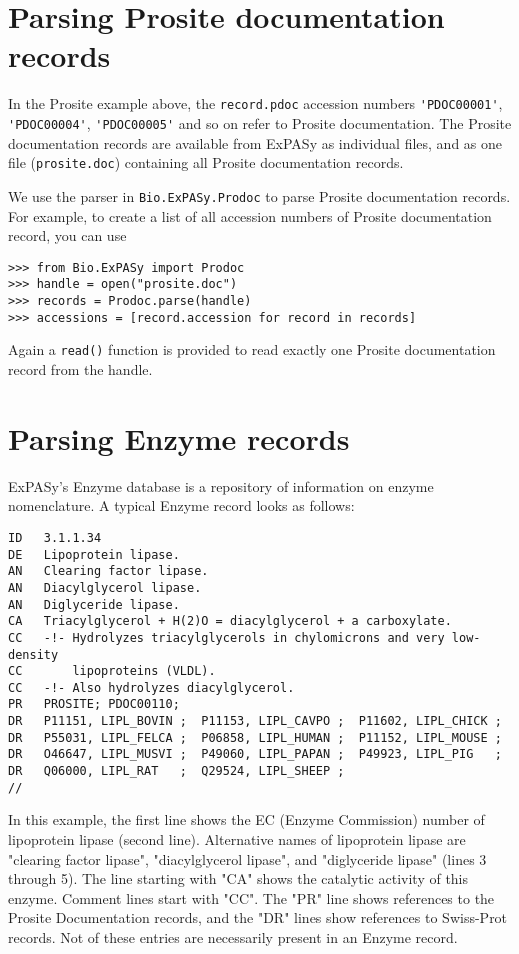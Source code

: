 \section{Parsing Prosite documentation records}

In the Prosite example above, the \verb|record.pdoc| accession numbers \verb|'PDOC00001'|, \verb|'PDOC00004'|, \verb|'PDOC00005'| and so on refer to Prosite documentation. The Prosite documentation records are available from ExPASy as individual files, and as one file (\verb|prosite.doc|) containing all Prosite documentation records.

We use the parser in \verb|Bio.ExPASy.Prodoc| to parse Prosite documentation records. For example, to create a list of all accession numbers of Prosite documentation record, you can use

\begin{verbatim}
>>> from Bio.ExPASy import Prodoc
>>> handle = open("prosite.doc")
>>> records = Prodoc.parse(handle)
>>> accessions = [record.accession for record in records]
\end{verbatim}

Again a \verb|read()| function is provided to read exactly one Prosite documentation record from the handle.

\section{Parsing Enzyme records}

ExPASy's Enzyme database is a repository of information on enzyme nomenclature. A typical Enzyme record looks as follows:

\begin{verbatim}
ID   3.1.1.34
DE   Lipoprotein lipase.
AN   Clearing factor lipase.
AN   Diacylglycerol lipase.
AN   Diglyceride lipase.
CA   Triacylglycerol + H(2)O = diacylglycerol + a carboxylate.
CC   -!- Hydrolyzes triacylglycerols in chylomicrons and very low-density
CC       lipoproteins (VLDL).
CC   -!- Also hydrolyzes diacylglycerol.
PR   PROSITE; PDOC00110;
DR   P11151, LIPL_BOVIN ;  P11153, LIPL_CAVPO ;  P11602, LIPL_CHICK ;
DR   P55031, LIPL_FELCA ;  P06858, LIPL_HUMAN ;  P11152, LIPL_MOUSE ;
DR   O46647, LIPL_MUSVI ;  P49060, LIPL_PAPAN ;  P49923, LIPL_PIG   ;
DR   Q06000, LIPL_RAT   ;  Q29524, LIPL_SHEEP ;
//
\end{verbatim}

In this example, the first line shows the EC (Enzyme Commission) number of lipoprotein lipase (second line). Alternative names of lipoprotein lipase are "clearing factor lipase", "diacylglycerol lipase", and "diglyceride lipase" (lines 3 through 5). The line starting with "CA" shows the catalytic activity of this enzyme. Comment lines start with "CC". The "PR" line shows references to the Prosite Documentation records, and the "DR" lines show references to Swiss-Prot records. Not of these entries are necessarily present in an Enzyme record.

